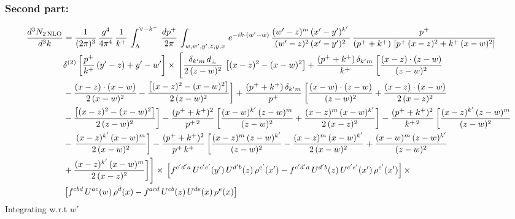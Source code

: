 \documentclass[9pt]{article}
\numberwithin{equation}{section}
\begin{document}
\subsubsection{Second part:\,}
\begin{align}
    \frac{d^{3}N_{2\,\rm NLO}}{d^{3}k} & =  \frac{1}{(2\pi)^{3}}\,\frac{g^{4}}{4\pi^{4}}\, \frac{1}{k^{+}}\,\int_{\Lambda}^{\vee-k^{+}}\, \frac{dp^{+}}{2\pi}\, \int_{w,w',y',z,y,x}\, e^{-ik\cdot (w'-w)}\, \frac{(w'-z)^{m}\,(x'-y')^{k'}\,}{(w'-z)^{2}\,(x'-y')^{2}\,}\, \frac{p^{+}}{(p^{+}+k^{+})\,\left[p^{+}\,(x-z)^{2}+k^{+}\,(x-w)^{2}\right]}\notag \\ & \delta^{(2)}\left[\frac{p^{+}}{k^{+}}\, (y'-z)+y'-w'\right]\times\, \Bigg[\frac{\delta_{k'm}\,d_{\perp}}{2\,(z-w)^{2}}\, \left[(x-z)^{2}-(x-w)^{2}\right]+\frac{(p^{+}+k^{+})\,\delta_{k'm}}{k^{+}}\,\bigg[\frac{(x-z)\cdot (z-w)}{(z-w)^{2}}\notag \\ & -\frac{(x-z)\cdot (x-w)}{2\,(x-w)^{2}}-\frac{\left[(x-z)^{2}-(x-w)^{2}\right]}{2\,(z-w)^{2}}\bigg]+\frac{(p^{+}+k^{+})\,\delta_{k'm}}{p^{+}}\,\bigg[\frac{(x-w)\cdot (z-w)}{(z-w)^{2}}+\frac{(x-z)\cdot (x-w)}{2\,(x-z)^{2}}\notag \\ & -\frac{\left[(x-z)^{2}-(x-w)^{2}\right]}{2\,(z-w)^{2}}\bigg]-\frac{(p^{+}+k^{+})^{2}}{p^{+\,2}}\,\bigg[\frac{(x-w)^{k'}\,(z-w)^{m}}{(z-w)^{2}}+\frac{(x-z)^{m}\,(x-w)^{k'}}{2\,(x-z)^{2}}\bigg]-\frac{(p^{+}+k^{+})^{2}}{k^{+\,2}}\,\bigg[\frac{(x-z)^{k'}\,(z-w)^{m}}{(z-w)^{2}}\notag \\ & -\,\frac{(x-z)^{k'}\,(x-w)^{m}}{2\,(x-w)^{2}}\bigg]-\frac{(p^{+}+k^{+})^{2}}{p^{+}\,k^{+}}\,\bigg[\frac{(x-z)^{m}\,(z-w)^{k'}}{(z-w)^{2}}-\frac{(x-z)^{m}\,(x-w)^{k'}}{2\,(x-w)^{2}}+\frac{(x-w)^{m}\,(z-w)^{k'}}{(z-w)^{2}}\notag \\ & +\frac{(x-z)^{k'}\,(x-w)^{m}}{2\,(x-z)^{2}}\bigg]\Bigg]\times\,\left[f^{c'd'a}\,U^{c'e'}(y')\,U^{d'b}(z)\,\rho^{e'}(x')-f^{c'd'a}\, 
    U^{d'b}(z)\,U^{c'e'}(x')\,\rho^{e'}(x')\right]\times \notag \\ & \left[f^{cbd}\,U^{ac}(w)\,\rho^{d}(x) -f^{acd}\,U^{cb}(z)\,U^{de}(x)\,\rho^{e}(x)\right]
\end{align}
Integrating w.r.t $w'$
\end{document}

